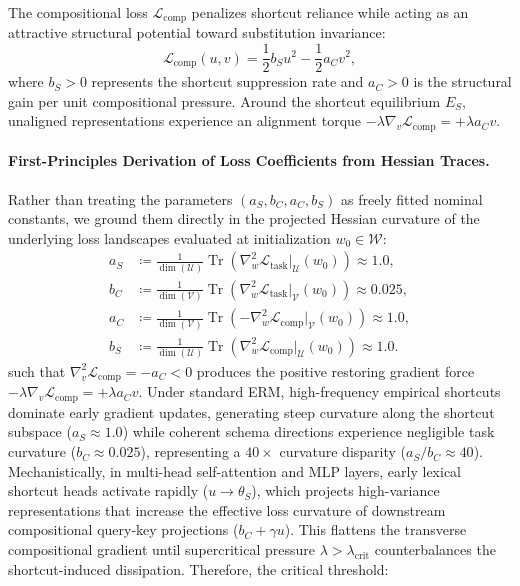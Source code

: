 \documentclass{article}
\theoremstyle{plain}
\theoremstyle{definition}
\DeclareMathOperator{\Tr}{Tr}
\begin{document}
The compositional loss $\mathcal{L}_{\text{comp}}$ penalizes shortcut reliance while acting as an attractive structural potential toward substitution invariance:
\begin{equation}
    \mathcal{L}_{\text{comp}}(u, v) = \frac{1}{2} b_S u^2 - \frac{1}{2} a_C v^2,
    \label{eq:comp_loss}
\end{equation}
where $b_S > 0$ represents the shortcut suppression rate and $a_C > 0$ is the structural gain per unit compositional pressure. Around the shortcut equilibrium $E_S$, unaligned representations experience an alignment torque $-\lambda \nabla_v \mathcal{L}_{\text{comp}} = +\lambda a_C v$.

\paragraph{First-Principles Derivation of Loss Coefficients from Hessian Traces.}
Rather than treating the parameters $(a_S, b_C, a_C, b_S)$ as freely fitted nominal constants, we ground them directly in the projected Hessian curvature of the underlying loss landscapes evaluated at initialization $w_0 \in \mathcal{W}$:
\begin{align}
    a_S &\coloneqq \frac{1}{\dim(\mathcal{U})} \Tr\left(\nabla_w^2 \mathcal{L}_{\text{task}}|_{\mathcal{U}}(w_0)\right) \approx 1.0, \label{eq:a_S_def} \\
    b_C &\coloneqq \frac{1}{\dim(\mathcal{V})} \Tr\left(\nabla_w^2 \mathcal{L}_{\text{task}}|_{\mathcal{V}}(w_0)\right) \approx 0.025, \label{eq:b_C_def} \\
    a_C &\coloneqq \frac{1}{\dim(\mathcal{V})} \Tr\left(-\nabla_w^2 \mathcal{L}_{\text{comp}}|_{\mathcal{V}}(w_0)\right) \approx 1.0, \label{eq:a_C_def} \\
    b_S &\coloneqq \frac{1}{\dim(\mathcal{U})} \Tr\left(\nabla_w^2 \mathcal{L}_{\text{comp}}|_{\mathcal{U}}(w_0)\right) \approx 1.0. \label{eq:b_S_def}
\end{align}
such that $\nabla_v^2 \mathcal{L}_{\text{comp}} = -a_C < 0$ produces the positive restoring gradient force $-\lambda \nabla_v \mathcal{L}_{\text{comp}} = +\lambda a_C v$. Under standard ERM, high-frequency empirical shortcuts dominate early gradient updates, generating steep curvature along the shortcut subspace ($a_S \approx 1.0$) while coherent schema directions experience negligible task curvature ($b_C \approx 0.025$), representing a $40\times$ curvature disparity ($a_S / b_C \approx 40$). Mechanistically, in multi-head self-attention and MLP layers, early lexical shortcut heads activate rapidly ($u \to \theta_S$), which projects high-variance representations that increase the effective loss curvature of downstream compositional query-key projections ($b_C + \gamma u$). This flattens the transverse compositional gradient until supercritical pressure $\lambda > \lambda_{\text{crit}}$ counterbalances the shortcut-induced dissipation. Therefore, the critical threshold:
\end{document}
